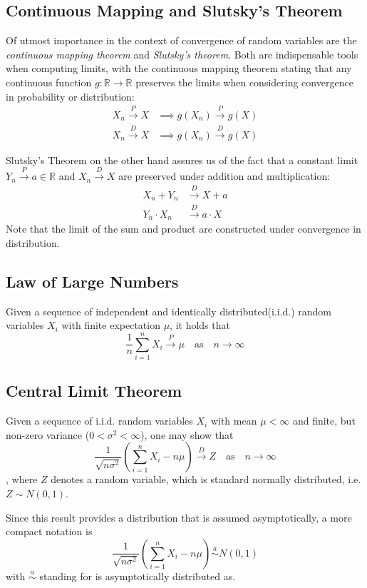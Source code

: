 \documentclass[12pt]{article}
\begin{document}
\subsection{Continuous Mapping and Slutsky's Theorem}
Of utmost importance in the context of convergence of random variables are the \textit{continuous mapping theorem} and \textit{Slutsky's theorem}. Both are indispensable tools when computing limits, with the continuous mapping theorem stating that any continuous function $g: \mathbb{R}\to \mathbb{R}$ preserves the limits when considering convergence in probability or distribution:
\begin{align*}
X_n \overset{P}\to X &\implies g(X_n)\overset{P}\to g(X) \\
X_n \overset{D}\to X &\implies g(X_n)\overset{D}\to g(X)
\end{align*}

Slutsky's Theorem on the other hand assures us of the fact that a constant limit $Y_n \overset{P}\to a \in\mathbb{R}$ and $X_n \overset{D}\to X$ are preserved under addition and multiplication:
\begin{align*}
X_n  + Y_n &\overset{D}\to X + a \\
Y_n \cdot X_n &\overset{D}\to a \cdot X
\end{align*}
Note that the limit of the sum and product are constructed under convergence in distribution.

\subsection{Law of Large Numbers}
Given a sequence of independent and identically distributed(i.i.d.) random variables $X_i$ with finite expectation $\mu$, it holds that
\[
\frac{1}{n} \sum_{i = 1}^n X_i \overset{P}\to \mu \quad \text{as} \quad n \to \infty
\]

\subsection{Central Limit Theorem}
Given a sequence of i.i.d. random variables $X_i$ with mean $\mu <\infty$ and finite, but non-zero variance ($0 < {\sigma}^2 <\infty$), one may show that
\[
\frac{1}{\sqrt{n \sigma^2}}\left(\sum_{i = 1}^n X_i - n\mu\right) \overset{D}\to Z \quad \text{as} \quad n \to \infty
\]
, where $Z$ denotes a random variable, which is standard normally distributed, i.e. $Z \sim N(0, 1)$.

Since this result provides a distribution that is assumed asymptotically, a more compact notation is
\[
\frac{1}{\sqrt{n \sigma^2}}\left(\sum_{i = 1}^n X_i - n\mu\right) \overset{a}\sim N(0, 1)
\]
with $\overset{a}\sim$ standing for \glqq is asymptotically distributed as\grqq .
\end{document}
